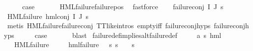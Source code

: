 \begin{isabellebody}
\ \ \isamarkupfalse%
\ \isamarkupfalse%
\ {\isacharquery}{\kern0pt}case\ \isanewline
\ \ \ \ \isamarkupfalse%
\ HML{\isacharunderscore}{\kern0pt}failure{\isachardot}{\kern0pt}failure{\isacharunderscore}{\kern0pt}pos\ \isamarkupfalse%
\ fastforce\isanewline
{}\isamarkupfalse%
\isanewline
\ \ \isamarkupfalse%
\ {\isacharparenleft}{\kern0pt}failure{\isacharunderscore}{\kern0pt}conj\ I\ J\ {\isasympsi}s{\isacharparenright}{\kern0pt}\isanewline
\ \ \isamarkupfalse%
\ {\isachardoublequoteopen}HML{\isacharunderscore}{\kern0pt}failure\ {\isacharparenleft}{\kern0pt}hml{\isacharunderscore}{\kern0pt}conj\ I\ J\ {\isasympsi}s{\isacharparenright}{\kern0pt}{\isachardoublequoteclose}\isanewline
\ \ \ \ \isamarkupfalse%
\ {\isacharparenleft}{\kern0pt}metis\ HML{\isacharunderscore}{\kern0pt}failure{\isachardot}{\kern0pt}failure{\isacharunderscore}{\kern0pt}conj\ TT{\isacharunderscore}{\kern0pt}like{\isachardot}{\kern0pt}intros{\isacharparenleft}{\kern0pt}{}{\isacharparenright}{\kern0pt}\ empty{\isacharunderscore}{\kern0pt}iff\ failure{\isacharunderscore}{\kern0pt}conj{\isachardot}{\kern0pt}hyps{\isacharparenleft}{\kern0pt}{}{\isacharparenright}{\kern0pt}\ failure{\isacharunderscore}{\kern0pt}conj{\isachardot}{\kern0pt}hyps{\isacharparenleft}{\kern0pt}{}{\isacharparenright}{\kern0pt}{\isacharparenright}{\kern0pt}\isanewline
\ \ \isamarkupfalse%
\ \isamarkupfalse%
\ {\isacharquery}{\kern0pt}case\ \isanewline
\ \ \ \ \isamarkupfalse%
\ blast\isanewline
{}\isamarkupfalse%
%
\endisatagproof
{\isafoldproof}%
%
\isadelimproof
\isanewline
%
\endisadelimproof
\isanewline
{}\isamarkupfalse%
\ failure{\isacharunderscore}{\kern0pt}def{\isacharunderscore}{\kern0pt}implies{\isacharunderscore}{\kern0pt}alt{\isacharunderscore}{\kern0pt}failure{\isacharunderscore}{\kern0pt}def{\isacharcolon}{\kern0pt}\isanewline
\ \ \ {\isasymphi}\ {\isacharcolon}{\kern0pt}{\isacharcolon}{\kern0pt}\ {\isachardoublequoteopen}{\isacharparenleft}{\kern0pt}{\isacharprime}{\kern0pt}a{\isacharcomma}{\kern0pt}\ {\isacharprime}{\kern0pt}s{\isacharparenright}{\kern0pt}\ hml{\isachardoublequoteclose}\isanewline
\ \ \ {\isachardoublequoteopen}HML{\isacharunderscore}{\kern0pt}failure\ {\isasymphi}{\isachardoublequoteclose}\isanewline
\ \ \ {\isachardoublequoteopen}{\isasymexists}{\isasympsi}{\isachardot}{\kern0pt}\ hml{\isacharunderscore}{\kern0pt}failure\ {\isasympsi}\ {\isasymand}\ {\isacharparenleft}{\kern0pt}{\isasymforall}s{\isachardot}{\kern0pt}\ {\isacharparenleft}{\kern0pt}s\ {\isasymTurnstile}\ {\isasymphi}{\isacharparenright}{\kern0pt}\ {\isasymlongleftrightarrow}\ {\isacharparenleft}{\kern0pt}s\ {\isasymTurnstile}\ {\isasympsi}{\isacharparenright}{\kern0pt}{\isacharparenright}{\kern0pt}{\isachardoublequoteclose}\isanewline

\end{isabellebody}
